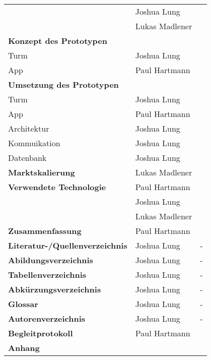 \begin{table}[!h]
\begin{tabular}{l|l|r}
                                           & Joshua Lung    &                     \\
                                           & Lukas Madlener &                     \\ \hline
    \textbf{Konzept des Prototypen}        &                &                     \\ \hline
    Turm                                   & Joshua Lung    &                     \\ \hline
    App                                    & Paul Hartmann  &                     \\ \hline
    \textbf{Umsetzung des Prototypen}      &                &                     \\ \hline
    Turm                                   & Joshua Lung    &                     \\ \hline
    App                                    & Paul Hartmann  &                     \\ \hline
    Architektur                            & Joshua Lung    &                     \\ \hline
    Kommuikation                           & Joshua Lung    &                     \\ \hline
    Datenbank                              & Joshua Lung    &                     \\ \hline
    \textbf{Marktskalierung}               & Lukas Madlener &                     \\ \hline
    \textbf{Verwendete Technologie}        & Paul Hartmann  &                     \\
                                           & Joshua Lung    &                     \\
                                           & Lukas Madlener &                     \\ \hline
    \textbf{Zusammenfassung}               & Paul Hartmann  &                     \\ \hline
    \textbf{Literatur-/Quellenverzeichnis} & Joshua Lung    & -                   \\ \hline
    \textbf{Abildungsverzeichnis}          & Joshua Lung    & -                   \\ \hline
    \textbf{Tabellenverzeichnis}           & Joshua Lung    & -                   \\ \hline
    \textbf{Abkürzungsverzeichnis}         & Joshua Lung    & -                   \\ \hline
    \textbf{Glossar}                       & Joshua Lung    & -                   \\ \hline
    \textbf{Autorenverzeichnis}            & Joshua Lung    & -                   \\ \hline
    \textbf{Begleitprotokoll}              & Paul Hartmann  &                     \\ \hline
    \textbf{Anhang}                        &                &                     \\ \hline
  \end{tabular}
\end{table}